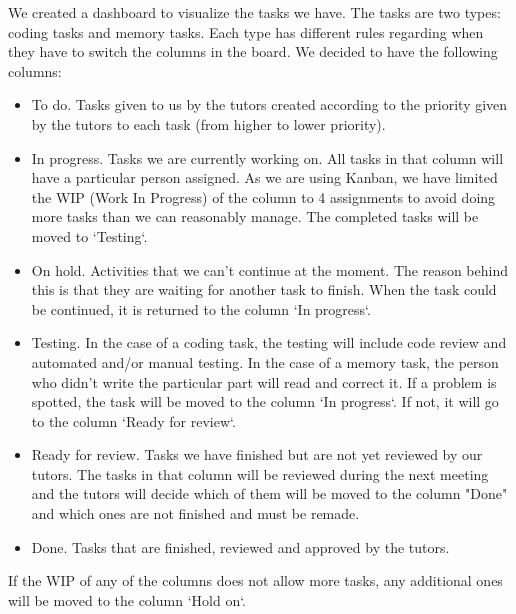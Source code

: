 We created a dashboard to visualize the tasks we have. The tasks are two types: coding tasks and memory tasks. Each type has different rules regarding when they have to switch the columns in the board. We decided to have the following columns:
\begin{itemize}
\item To do. Tasks given to us by the tutors created according to the priority given by the tutors to each task (from higher to lower priority). 
\item In progress. Tasks we are currently working on. All tasks in that column will have a particular person assigned. As we are using Kanban, we have limited the WIP (Work In Progress) of the column to 4 assignments to avoid doing more tasks than we can reasonably manage. The completed tasks will be moved to `Testing`.
\item On hold. Activities that we can't continue at the moment. The reason behind this is that they are waiting for another task to finish. When the task could be continued, it is returned to the column `In progress`.
\item Testing. In the case of a coding task, the testing will include code review and automated and/or manual testing. In the case of a memory task, the person who didn't write the particular part will read and correct it. If a problem is spotted, the task will be moved to the column `In progress`. If not, it will go to the column `Ready for review`.
\item Ready for review.  Tasks we have finished but are not yet reviewed by our tutors. The tasks in that column will be reviewed during the next meeting and the tutors will decide which of them will be moved to the column "Done" and which ones are not finished and must be remade.
\item Done. Tasks that are finished, reviewed and approved by the tutors.
\end{itemize}

If the WIP of any of the columns does not allow more tasks, any additional ones will be moved to the column `Hold on`. 
